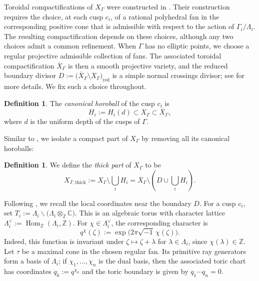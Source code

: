 \documentclass[12 pt]{amsart}
\theoremstyle{definition}
\newtheorem{definition}[theorem]{Definition}
\begin{document}
Toroidal compactifications of $X_\Gamma$ were constructed in
\cite{Cmpftification}. Their construction requires the choice, at each
cusp $c_i$, of a rational polyhedral fan in the corresponding positive
cone that is admissible with respect to the action of
$\Gamma_i/\Lambda_i$. The resulting compactification depends
on these choices, although any two choices admit a common refinement.
When $\Gamma$ has no elliptic points, we choose a regular projective
admissible collection of fans. The associated toroidal compactification
\(\overline X_\Gamma\) is then a smooth projective variety, and the reduced
boundary divisor
\(D:=\bigl(\overline X_\Gamma\setminus X_\Gamma\bigr)_{\mathrm{red}} \)
is a simple normal crossings divisor; see
\cite[\S 1, \S 4]{bakker2018geometric} for more details. We fix such a choice
throughout.

\begin{definition}
The \emph{canonical horoball} of the cusp $c_i$ is
\[
H_i:=H_i(d)\subset X_\Gamma\subset\overline X_\Gamma,
\]
where $d$ is the uniform depth of the cusps of $\Gamma$. 
\end{definition}
Similar to \cite[\S 4]{memariansorkhabi2025volumes}, we isolate a
compact part of $X_\Gamma$ by removing all its canonical
horoballs:

\begin{definition} \label{core}
We define the \emph{thick part} of $X_\Gamma$ to be
\[
X_{\Gamma,\mathrm{thick}}
:=X_\Gamma\setminus\bigcup_iH_i
=\overline X_\Gamma\setminus
\left(D\cup\bigcup_iH_i\right).
\]
\end{definition}
Following \cite[\S 1, pp. 7--8]{bakker2018geometric}, we recall the local coordinates near the boundary \(D\). For a cusp $c_i$, set
\(
T_i:=\Lambda_i\backslash
\bigl(\Lambda_i\otimes_{\mathbb Z}\mathbb C\bigr).
\)
This is an algebraic torus with character lattice
\(
\Lambda_i^\vee:=\operatorname{Hom}_{\mathbb Z}(\Lambda_i,\mathbb Z).
\)
For $\chi\in\Lambda_i^\vee$, the corresponding character is
\[
q^\chi(\zeta):=
\exp\bigl(2\pi\sqrt{-1}\,\chi(\zeta)\bigr).
\]
Indeed, this function is invariant under $\zeta\mapsto\zeta+\lambda$ for
$\lambda\in\Lambda_i$, since $\chi(\lambda)\in\mathbb Z$. Let $\tau$ be a
maximal cone in the chosen regular fan. Its primitive ray generators form
a basis of $\Lambda_i$; if $\chi_1,\ldots,\chi_n$ is the dual basis, then
the associated toric chart has coordinates
\(
q_k:=q^{\chi_k}
\)
and the toric boundary is given by
\(
q_1\cdots q_n=0.
\)
\end{document}
